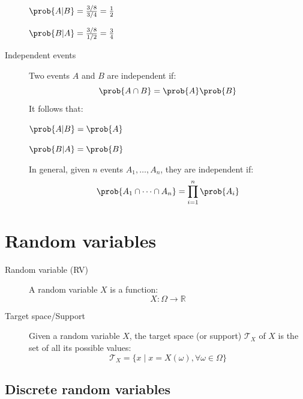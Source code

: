 \begin{description}
\begin{example}
            \begin{minipage}{.48\linewidth}
                \centering
                $\prob{A \vert B} = \frac{3/8}{3/4} = \frac{1}{2}$
            \end{minipage}
            \begin{minipage}{.48\linewidth}
                \centering
                $\prob{B \vert A} = \frac{3/8}{1/2} = \frac{3}{4}$
            \end{minipage}
        \end{example}

    \item[Independent events] 
        Two events $A$ and $B$ are independent if:
        \[ \prob{A \cap B} = \prob{A}\prob{B} \]
        It follows that:

        \begin{minipage}{.48\linewidth}
            \centering
            $\prob{A \vert B} = \prob{A}$
        \end{minipage}
        \begin{minipage}{.48\linewidth}
            \centering
            $\prob{B \vert A} = \prob{B}$
        \end{minipage}

        In general, given $n$ events $A_1, \dots, A_n$, they are independent if:
        \[ \prob{A_1 \cap \dots \cap A_n} = \prod_{i=1}^{n} \prob{A_i} \]
\end{description}



\section{Random variables}
\begin{description}
    \item[Random variable (RV)] 
        A random variable $X$ is a function:
        \[ X: \Omega \rightarrow \mathbb{R} \]

    \item[Target space/Support] 
        Given a random variable $X$, 
        the target space (or support) $\mathcal{T}_X$ of $X$ is the set of all its possible values:
        \[ \mathcal{T}_X = \{ x \mid x = X(\omega), \forall \omega \in \Omega \} \]
\end{description}


\subsection{Discrete random variables}

